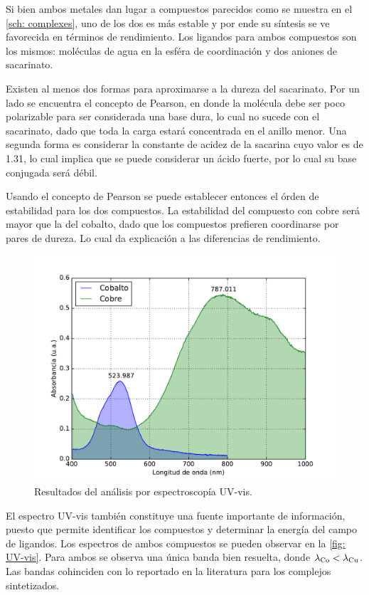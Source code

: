 \documentclass[fleqn,10pt]{SelfArx} %
\begin{document}
	Si bien ambos metales dan lugar a compuestos parecidos como se muestra en el \autoref{sch: complexes}, uno de los dos es m\'as estable y por ende su s\'intesis se ve favorecida en t\'erminos de rendimiento. Los ligandos para ambos compuestos son los mismos: mol\'eculas de agua en la esf\'era de coordinaci\'on y dos aniones de sacarinato.
	
	Existen al menos dos formas para aproximarse a la dureza del sacarinato. Por un lado se encuentra el concepto de Pearson, en donde la mol\'ecula debe ser poco polarizable para ser considerada una base dura, lo cual no sucede con el sacarinato, dado que toda la carga estar\'a concentrada en el anillo menor. Una segunda forma es considerar la constante de acidez de la sacarina cuyo valor es de 1.31, lo cual implica que se puede considerar un \'acido fuerte, por lo cual su base conjugada ser\'a d\'ebil.
	
	\pagebreak
	Usando el concepto de Pearson se puede establecer entonces el \'orden de estabilidad para los dos compuestos. La estabilidad del compuesto con cobre ser\'a mayor que la del cobalto, dado que los compuestos prefieren coordinarse por pares de dureza. Lo cual da explicaci\'on a las diferencias de rendimiento.
	\begin{figure}[h]
		\centering
		\includegraphics[width=\linewidth]{images/absorbances.pdf}
		\caption{Resultados del an\'alisis por espectroscop\'ia UV-vis.}
		\label{fig: UV-vis}
	\end{figure}
	
	El espectro UV-vis tambi\'en constituye una fuente importante de informaci\'on, puesto que permite identificar los compuestos y determinar la energ\'ia del campo de ligandos. Los espectros de ambos compuestos se pueden observar en la \autoref{fig: UV-vis}. Para ambos se observa una \'unica banda bien resuelta, donde $\lambda_{\ce{Co}} < \lambda_{\ce{Cu}}$. Las bandas cohinciden con lo reportado en la literatura para los complejos sintetizados.
\end{document}
